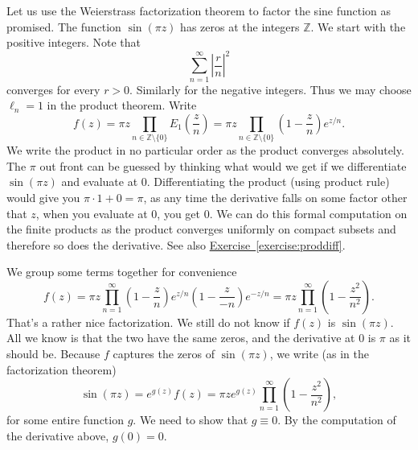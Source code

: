 \documentclass[12pt,openany]{book}
\newcommand{\abs}[1]{\left\lvert {#1} \right\rvert}
\newcommand{\Z}{{\mathbb{Z}}}
\theoremstyle{plain}
\theoremstyle{remark}
\theoremstyle{definition}
\theoremstyle{exercise}
\theoremstyle{example}
\newcommand{\exerciseref}[1]{\hyperref[#1]{Exercise~\ref*{#1}}}
\begin{document}
Let us use the Weierstrass factorization theorem to factor the sine function
as promised.  The function $\sin(\pi z)$ has zeros at the integers $\Z$.
We start with the positive integers.  Note that
\begin{equation*}
\sum_{n=1}^\infty \abs{\frac{r}{n}}^{2}
\end{equation*}
converges for every $r > 0$.  Similarly for the negative integers.  Thus we
may choose $\ell_n =1$ in the product theorem.  Write
\begin{equation*}
f(z) =
\pi z \prod_{n \in \Z \setminus \{ 0 \}} E_1\left(\frac{z}{n}\right)
= 
\pi z \prod_{n \in \Z \setminus \{ 0 \}} \left(1-\frac{z}{n}\right) e^{z/n} .
\end{equation*}
We write the product in no particular order as the product converges
absolutely.
The $\pi$ out front can be guessed by thinking what would we get if we
differentiate $\sin(\pi z)$ and evaluate at $0$.
Differentiating the product (using product rule) would give you $\pi \cdot 1
+ 0=\pi$, as any time the derivative falls on some factor other that $z$, when
you evaluate at $0$, you get $0$.  We can do this formal computation on the
finite products as the product converges uniformly on compact subsets and
therefore so does the derivative.  See also \exerciseref{exercise:proddiff}.

We group some terms together for convenience
\begin{equation*}
f(z) =
\pi z \prod_{n=1}^\infty 
\left(1-\frac{z}{n}\right) e^{z/n}
\left(1-\frac{z}{-n}\right) e^{-z/n}
=
\pi z \prod_{n=1}^\infty 
\left(1-\frac{z^2}{n^2}\right) .
\end{equation*}
That's a rather nice factorization.  We still do not know if $f(z)$ is
$\sin(\pi z)$.
All we know is that the two have the same zeros,
and the derivative at $0$ is $\pi$ as it should be.
Because $f$ captures the zeros of $\sin(\pi z)$, we write
(as in the factorization theorem)
\begin{equation*}
\sin(\pi z)
= 
e^{g(z)} f(z)
=
\pi z
e^{g(z)}
\prod_{n=1}^\infty 
\left(1-\frac{z^2}{n^2}\right) ,
\end{equation*}
for some entire function $g$.  We need to show that $g \equiv 0$.  By the
computation of the derivative above, $g(0) = 0$.
\end{document}
